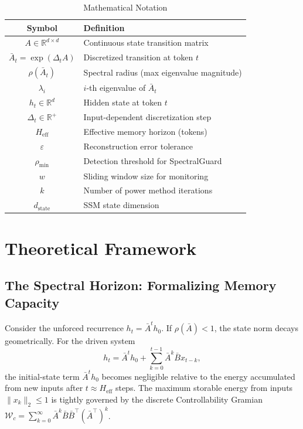 \documentclass[10pt,twocolumn]{article}
\begin{document}
\begin{table}[t]
\centering
\caption{Mathematical Notation}
\label{tab:notation}
\small
\begin{tabular}{cl}
\toprule
\textbf{Symbol} & \textbf{Definition} \\
\midrule
$A \in \mathbb{R}^{d \times d}$ & Continuous state transition matrix \\
$\bar{A}_t = \exp(\Delta_t A)$ & Discretized transition at token $t$ \\
$\rho(\bar{A}_t)$ & Spectral radius (max eigenvalue magnitude) \\
$\lambda_i$ & $i$-th eigenvalue of $\bar{A}_t$ \\
$h_t \in \mathbb{R}^d$ & Hidden state at token $t$ \\
$\Delta_t \in \mathbb{R}^+$ & Input-dependent discretization step \\
$H_{\text{eff}}$ & Effective memory horizon (tokens) \\
$\varepsilon$ & Reconstruction error tolerance \\
$\rho_{\min}$ & Detection threshold for SpectralGuard \\
$w$ & Sliding window size for monitoring \\
$k$ & Number of power method iterations \\
$d_{\text{state}}$ & SSM state dimension \\
\bottomrule
\end{tabular}
\end{table}

\section{Theoretical Framework}
\label{sec:theory}

\subsection{The Spectral Horizon: Formalizing Memory Capacity}

Consider the unforced recurrence $h_t = \bar{A}^t h_0$. If $\rho(\bar{A})<1$, the state norm decays geometrically. For the driven system
\begin{equation}
h_t = \bar{A}^t h_0 + \sum_{k=0}^{t-1} \bar{A}^k \bar{B} x_{t-k},
\label{eq:unrolled}
\end{equation}
the initial-state term $\bar{A}^t h_0$ becomes negligible relative to the energy accumulated from new inputs after $t \approx H_{\text{eff}}$ steps. The maximum storable energy from inputs $\|x_k\|_2 \le 1$ is tightly governed by the discrete Controllability Gramian $\mathcal{W}_c = \sum_{k=0}^{\infty} \bar{A}^k \bar{B} \bar{B}^\top (\bar{A}^\top)^k$.
\end{document}
